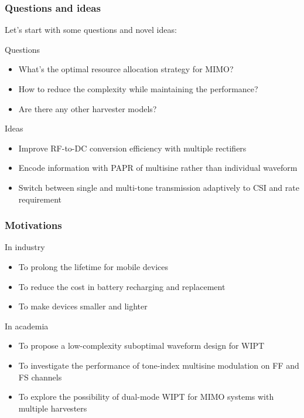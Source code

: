\documentclass{beamer}
\begin{document}
\begin{frame}
\frametitle{Questions and ideas}

Let's start with some questions and novel ideas:

\begin{block}{Questions}
\begin{itemize}
  \item What's the optimal resource allocation strategy for MIMO?
  \item How to reduce the complexity while maintaining the performance?
  \item Are there any other harvester models?
\end{itemize}
\end{block}

\begin{block}{Ideas}
\begin{itemize}
  \item Improve RF-to-DC conversion efficiency with multiple rectifiers \cite{Ma2019}
  \item Encode information with PAPR of multisine rather than individual waveform \cite{Park2018, Krikidis2019}
  \item Switch between single and multi-tone transmission adaptively to CSI and rate requirement \cite{Park2018}
\end{itemize}
\end{block}

\end{frame}

\begin{frame}
\frametitle{Motivations}

\begin{block}{In industry}
\begin{itemize}
  \item To prolong the lifetime for mobile devices
  \item To reduce the cost in battery recharging and replacement
  \item To make devices smaller and lighter
\end{itemize}
\end{block}

\begin{block}{In academia}
\begin{itemize}
  \item To propose a low-complexity suboptimal waveform design for WIPT
  \item To investigate the performance of tone-index multisine modulation on FF and FS channels
  \item To explore the possibility of dual-mode WIPT for MIMO systems with multiple harvesters
\end{itemize}
\end{block}

\end{frame}
\end{document}

